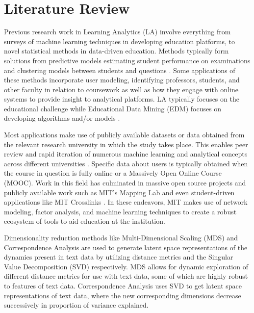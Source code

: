 %
%
%

\chapter{Literature Review}
\label{literature-review}





\indent Previous research work in Learning Analytics (LA) involve everything from surveys of machine learning techniques in developing education platforms, to novel statistical methods in data-driven education. Methods typically form solutions from predictive models estimating student performance on examinations and clustering models between students and questions \cite{barbu_data_nodate}. Some applications of these methods incorporate user modeling, identifying professors, students, and other faculty in relation to coursework as well as how they engage with online systems to provide insight to analytical platforms. LA typically focuses on the educational challenge while Educational Data Mining (EDM) focuses on developing algorithms and/or models \cite{hilliger_evaluating_2019}.

\indent Most applications make use of publicly available datasets \cite{romero_educational_2020} or data obtained from the relevant research university in which the study takes place. This enables peer review and rapid iteration of numerous machine learning and analytical concepts across different universities \cite{barbu_data_nodate}\cite{romero_educational_2020}\cite{hilliger_evaluating_2019}.  Specific data about users is typically obtained when the course in question is fully online or a Massively Open Online Course (MOOC). Work in this field has culminated in massive open source projects and publicly available work such as MIT’s Mapping Lab and even student-driven applications like MIT Crosslinks \cite{willcox_network_2017}. In these endeavors, MIT makes use of network modeling,  factor analysis, and machine learning techniques to create a robust ecosystem of tools to aid education at the institution. 

Dimensionality reduction methods like Multi-Dimensional Scaling (MDS) \cite{jjs} and Correspondence Analysis are used to generate latent space representations of the dynamics present in text data by utilizing distance metrics and the Singular Value Decomposition (SVD) respectively.  MDS allows for dynamic exploration of different distance metrics for use with text data, some of which are highly robust to features of text data.  Correspondence Analysis uses SVD to get latent space representations of text data,  where the new corresponding dimensions decrease successively in proportion of variance explained. 


